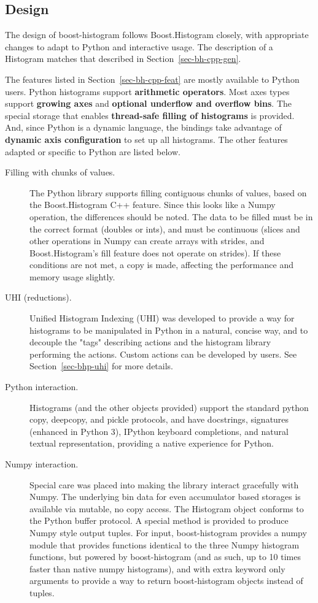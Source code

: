 \documentclass{webofc}
\begin{document}
\subsection{Design}
\label{sec-bhp-design}

The design of boost-histogram follows Boost.Histogram closely, with appropriate changes to adapt to Python and interactive usage. The description of a Histogram matches that described in Section~\ref{sec-bh-cpp-gen}.

The features listed in Section~\ref{sec-bh-cpp-feat} are mostly available to Python users. Python histograms support \textbf{arithmetic operators}. Most axes types support \textbf{growing axes} and \textbf{optional underflow and overflow bins}. The special storage that enables \textbf{thread-safe filling of histograms} is provided. And, since Python is a dynamic language, the bindings take advantage of \textbf{dynamic axis configuration} to set up all histograms. The other features adapted or specific to Python are listed below.

\begin{description}
\item[Filling with chunks of values.] The Python library supports filling contiguous chunks of values, based on the Boost.Histogram C++ feature. Since this looks like a Numpy operation, the differences should be noted. The data to be filled must be in the correct format (doubles or ints), and must be continuous (slices and other operations in Numpy can create arrays with strides, and Boost.Histogram's fill feature does not operate on strides). If these conditions are not met, a copy is made, affecting the performance and memory usage slightly.
\item[UHI (reductions).] Unified Histogram Indexing (UHI) was developed to provide a way for histograms to be manipulated in Python in a natural, concise way, and to decouple the "tags" describing actions and the histogram library performing the actions. Custom actions can be developed by users. See Section~\ref{sec-bhp-uhi} for more details.
\item[Python interaction.] Histograms (and the other objects provided) support the standard python copy, deepcopy, and pickle protocols, and have docstrings, signatures (enhanced in Python 3), IPython keyboard completions, and natural textual representation,  providing a native experience for Python.
\item[Numpy interaction.] Special care was placed into making the library interact gracefully with Numpy. The underlying bin data for even accumulator based storages is available via mutable, no copy access. The  Histogram object conforms to the Python buffer protocol. A special method is provided to produce Numpy style output tuples. For input, boost-histogram provides a numpy module that provides functions identical to the three Numpy histogram functions, but powered by boost-histogram (and as such, up to 10 times faster than native numpy histograms), and with extra keyword only arguments to provide a way to return boost-histogram objects instead of tuples.
\end{description}
\end{document}
